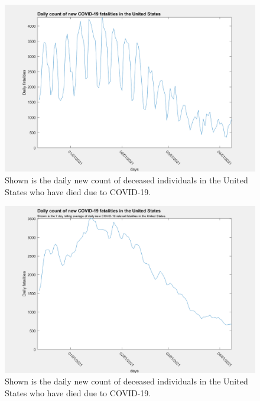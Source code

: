 \documentclass[twoside]{article}
\begin{document}
\begin{multicols}{2}
\begin{figure}[H]
	\includegraphics[width=\linewidth]{images/usa_daily_fatalities_unprocessed.png}
	\caption{Shown is the daily new count of deceased individuals in the United States who have died due to COVID-19.}
	\label{fig:images/usa_daily_fatalities_unprocessedLabel}
\end{figure}

\begin{figure}[H]
	\includegraphics[width=\linewidth]{images/usa_daily_fatalities_processed.png}
	\caption{Shown is the daily new count of deceased individuals in the United States who have died due to COVID-19.}
	\label{fig:images/usa_daily_fatalities_processedLabel}
\end{figure}


\end{multicols}
\end{document}

